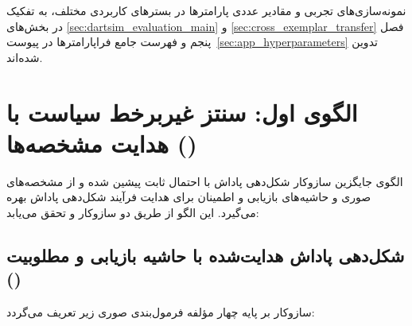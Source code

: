 \documentclass[oneside,openany,phd]{TMU-Thesis}
\begin{document}
نمونه‌سازی‌های تجربی و مقادیر عددی پارامترها در بسترهای کاربردی مختلف، به تفکیک در بخش‌های \ref{sec:dartsim_evaluation_main} و \ref{sec:cross_exemplar_transfer} فصل پنجم و فهرست جامع فراپارامترها در پیوست~\ref{sec:app_hyperparameters} تدوین شده‌اند.

\section{الگوی اول: سنتز غیربرخط سیاست با هدایت مشخصه‌ها (\texorpdfstring{\sgos}{SG-OS})}
\label{sec:sgos_pattern}
\label{sec:sgos_pattern_formal}

الگوی \sgos جایگزین سازوکار شکل‌دهی پاداش با احتمال ثابت پیشین شده و از مشخصه‌های صوری و حاشیه‌های بازیابی و اطمینان برای هدایت فرآیند شکل‌دهی پاداش بهره می‌گیرد. این الگو از طریق دو سازوکار \mursdrl و \cmrsdrl تحقق می‌یابد:

\subsection{شکل‌دهی پاداش هدایت‌شده با حاشیه بازیابی و مطلوبیت (\mursdrl)}
\label{subsec:mu_rs_drl_method}

سازوکار \mursdrl بر پایه چهار مؤلفه فرمول‌بندی صوری زیر تعریف می‌گردد:
\end{document}
